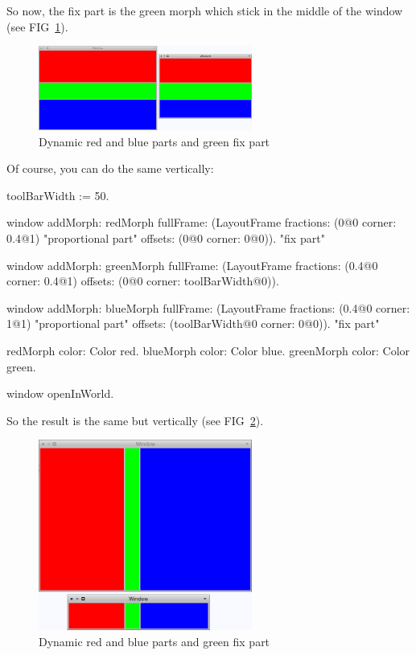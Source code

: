 \documentclass[a4paper,10pt,twoside]{book}
\begin{document}
So now, the fix part is the green morph which stick in the middle of the window (see FIG~\ref{fig:layoutFrame3}).

\begin{figure}[ht]\centering
	\includegraphics[width=7cm]{LayoutFrame3}
	\caption{Dynamic red and blue parts and green fix part}
	\label{fig:layoutFrame3}
\end{figure}

Of course, you can do the same vertically:
\begin{code}{}
toolBarWidth := 50.

window
	addMorph: redMorph
	fullFrame: (LayoutFrame
				fractions: (0@0 corner: 0.4@1) "proportional part"
				offsets: (0@0 corner: 0@0)). "fix part"
				
window
	addMorph: greenMorph
	fullFrame: (LayoutFrame
				fractions: (0.4@0 corner: 0.4@1)
				offsets: (0@0 corner: toolBarWidth@0)).				

window
	addMorph: blueMorph
	fullFrame: (LayoutFrame
				fractions: (0.4@0 corner: 1@1) "proportional part"
				offsets: (toolBarWidth@0 corner: 0@0)). "fix part"

redMorph color: Color red.
blueMorph color: Color blue.
greenMorph color: Color green.
	
window openInWorld.
\end{code}

So the result is the same but vertically (see FIG~\ref{fig:layoutFrame4}).

\begin{figure}[ht]\centering
	\includegraphics[width=7cm]{LayoutFrame4}
	\caption{Dynamic red and blue parts and green fix part}
	\label{fig:layoutFrame4}
\end{figure}
\end{document}
